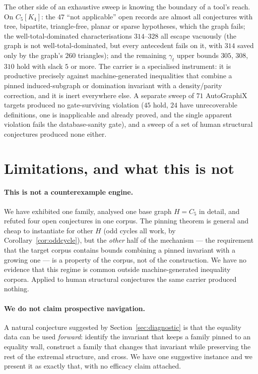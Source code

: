 \documentclass[10pt,a4paper]{article}
\theoremstyle{plain}
\theoremstyle{definition}
\newcommand{\gt}{\gamma_t}
\newcommand{\blow}[2]{#1[K_{#2}]}
\begin{document}
The other side of an exhaustive sweep is knowing the boundary of a tool's reach. On
$\blow{C_5}{4}$: the $47$ ``not applicable'' open records are almost all conjectures with tree,
bipartite, triangle-free, planar or sparse hypotheses, which the graph fails; the
well-total-dominated characterisations $314$--$328$ all escape vacuously (the graph is not
well-total-dominated, but every antecedent fails on it, with $314$ saved only by the graph's
$260$ triangles); and the remaining $\gt$ upper bounds $305$, $308$, $310$ hold with slack $5$
or more. The carrier is a specialised instrument: it is productive precisely against
machine-generated inequalities that combine a pinned induced-subgraph or domination invariant
with a density/parity correction, and it is inert everywhere else. A separate sweep of $71$
AutoGraphiX targets produced no gate-surviving violation ($45$ hold, $24$ have unrecoverable
definitions, one is inapplicable and already proved, and the single apparent violation fails the
database-sanity gate), and a sweep of a set of human structural conjectures produced none
either.

\section{Limitations, and what this is not}\label{sec:limits}

\paragraph{This is not a counterexample engine.} We have exhibited one family, analysed one
base graph $H = C_5$ in detail, and refuted four open conjectures in one corpus. The pinning
theorem is general and cheap to instantiate for other $H$ (odd cycles all work, by
Corollary~\ref{cor:oddcycle}), but the \emph{other} half of the mechanism --- the requirement
that the target corpus contains bounds combining a pinned invariant with a growing one --- is a
property of the corpus, not of the construction. We have no evidence that this regime is common
outside machine-generated inequality corpora. Applied to human structural conjectures the same
carrier produced nothing.

\paragraph{We do not claim prospective navigation.} A natural conjecture suggested by
Section~\ref{sec:diagnostic} is that the equality data can be used \emph{forward}: identify the
invariant that keeps a family pinned to an equality wall, construct a family that changes that
invariant while preserving the rest of the extremal structure, and cross. We have one
suggestive instance and we present it as exactly that, with no efficacy claim attached.
\end{document}
